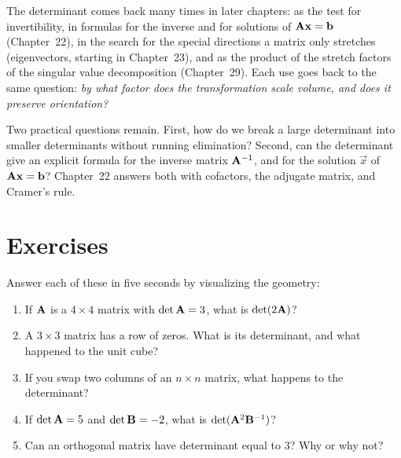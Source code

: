 \begin{aestheticbox}
The determinant comes back many times in later chapters: as the test for
invertibility, in formulas for the inverse and for solutions of
$\mathbf{A}\mathbf{x} = \mathbf{b}$ (Chapter~22), in the search for the special directions
a matrix only stretches (eigenvectors, starting in Chapter~23), and as the product of the stretch
factors of the singular value decomposition (Chapter~29). Each use goes back to the same
question: \emph{by what factor does the transformation scale volume, and does it
preserve orientation?}
\end{aestheticbox}

Two practical questions remain. First, how do we break a large
determinant into smaller determinants without running elimination?
Second, can the determinant give an explicit
formula for the inverse matrix $\mathbf{A}^{-1}$, and for the solution $\vec{x}$
of $\mathbf{A}\mathbf{x}=\mathbf{b}$? Chapter~22 answers both
with cofactors, the adjugate matrix, and Cramer's rule.

\section{Exercises}
\label{ch21:exercises}

\begin{exercise}
\label{ch21:ex-mental}
Answer each of these in five seconds by visualizing the geometry:
\begin{enumerate}[label=(\alph*)]
  \item If $\mathbf{A}$ is a $4\times 4$ matrix with $\det\mathbf{A} = 3$, what is $\det(2\mathbf{A})$?
  \item A $3\times 3$ matrix has a row of zeros. What is its determinant, and what happened to the unit cube?
  \item If you swap two columns of an $n\times n$ matrix, what happens to the determinant?
  \item If $\det\mathbf{A} = 5$ and $\det\mathbf{B} = -2$, what is $\det(\mathbf{A}^2\mathbf{B}^{-1})$?
  \item Can an orthogonal matrix have determinant equal to $3$? Why or why not?
\end{enumerate}
\end{exercise}


